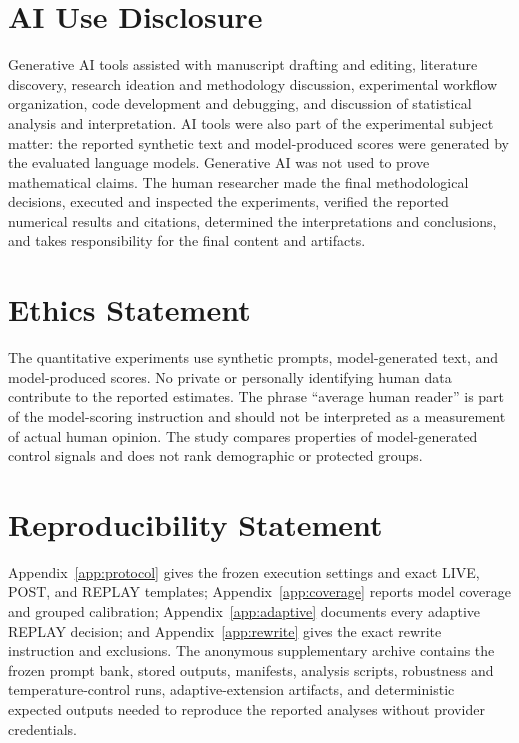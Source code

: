 \section*{AI Use Disclosure}
Generative AI tools assisted with manuscript drafting and editing, literature discovery, research ideation and methodology discussion, experimental workflow organization, code development and debugging, and discussion of statistical analysis and interpretation. AI tools were also part of the experimental subject matter: the reported synthetic text and model-produced scores were generated by the evaluated language models. Generative AI was not used to prove mathematical claims. The human researcher made the final methodological decisions, executed and inspected the experiments, verified the reported numerical results and citations, determined the interpretations and conclusions, and takes responsibility for the final content and artifacts.

\section*{Ethics Statement}
The quantitative experiments use synthetic prompts, model-generated text, and model-produced scores. No private or personally identifying human data contribute to the reported estimates. The phrase ``average human reader'' is part of the model-scoring instruction and should not be interpreted as a measurement of actual human opinion. The study compares properties of model-generated control signals and does not rank demographic or protected groups.

\section*{Reproducibility Statement}
Appendix~\ref{app:protocol} gives the frozen execution settings and exact LIVE, POST, and REPLAY templates; Appendix~\ref{app:coverage} reports model coverage and grouped calibration; Appendix~\ref{app:adaptive} documents every adaptive REPLAY decision; and Appendix~\ref{app:rewrite} gives the exact rewrite instruction and exclusions. The anonymous supplementary archive contains the frozen prompt bank, stored outputs, manifests, analysis scripts, robustness and temperature-control runs, adaptive-extension artifacts, and deterministic expected outputs needed to reproduce the reported analyses without provider credentials.
